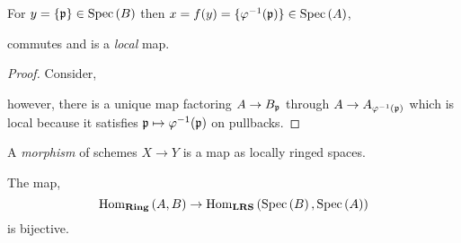 \documentclass[12pt]{article}
\begin{document}
\begin{prop}
For $y = \{ \mathfrak{p} \} \in \mathrm{Spec}\left( B \right)$ then $x = f(y) = \{ \varphi^{-1}(\mathfrak{p}) \} \in \mathrm{Spec}\left( A \right)$,
\begin{center}
\end{center}
commutes and is a \textit{local} map.
\end{prop}

\begin{proof}
Consider,
\begin{center}
\end{center}
however, there is a unique map factoring $A \to B_{\mathfrak{p}}$ through $A \to A_{\varphi^{-1}(\mathfrak{p})}$ which is local because it satisfies $\mathfrak{p} \mapsto \varphi^{-1}(\mathfrak{p})$ on pullbacks.
\end{proof}

\begin{defn}
A \textit{morphism} of schemes $X \to Y$ is a map as locally ringed spaces.
\end{defn}

\begin{thm}
The map,
\[ \mathrm{Hom}_{\mathbf{Ring}} \left( A, B \right) \to \mathrm{Hom}_{\mathbf{LRS}} \left( \mathrm{Spec}\left( B \right), \mathrm{Spec}\left( A \right) \right) \]
is bijective.
\end{thm}
\end{document}
